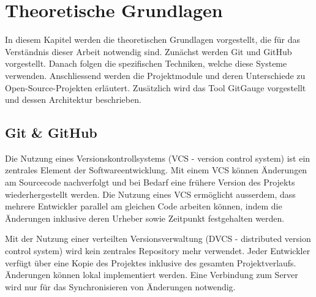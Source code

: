 

\label{Chapter2} %


\chapter{Theoretische Grundlagen} %

In diesem Kapitel werden die theoretischen Grundlagen vorgestellt, die für das Verständnis dieser Arbeit notwendig sind. Zunächst werden Git und GitHub vorgestellt. Danach folgen die spezifischen Techniken, welche diese Systeme verwenden. Anschliessend werden die Projektmodule und deren Unterschiede zu Open-Source-Projekten erläutert. Zusätzlich wird das Tool GitGauge vorgestellt und dessen Architektur beschrieben.

\label{Chapter2} %


\section{Git \& GitHub}
Die Nutzung eines Versionskontrollsystems (VCS - version control system) ist ein zentrales Element der Softwareentwicklung. Mit einem VCS können Änderungen am Sourcecode nachverfolgt und bei Bedarf eine frühere Version des Projekts wiederhergestellt werden. Die Nutzung eines VCS ermöglicht ausserdem, dass mehrere Entwickler parallel am gleichen Code arbeiten können, indem die Änderungen inklusive deren Urheber sowie Zeitpunkt festgehalten werden. \parencite{noauthor_informationen_2025} 

Mit der Nutzung einer verteilten Versionsverwaltung (DVCS - distributed version control system) wird kein zentrales Repository mehr verwendet. Jeder Entwickler verfügt über eine Kopie des Projektes inklusive des gesamten Projektverlaufs. Änderungen können lokal implementiert werden. Eine Verbindung zum Server wird nur für das Synchronisieren von Änderungen notwendig. \parencite{noauthor_informationen_2025} 

